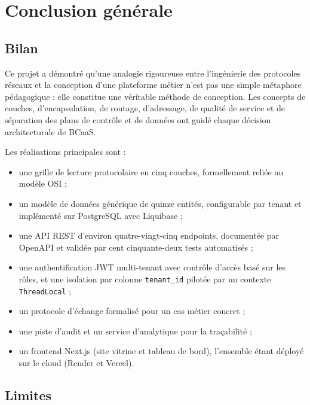 \chapter{Conclusion générale}
\label{chap:conclusion}

\section{Bilan}

Ce projet a démontré qu'une analogie rigoureuse entre l'ingénierie des protocoles réseaux
et la conception d'une plateforme métier n'est pas une simple métaphore pédagogique :
elle constitue une véritable méthode de conception. Les concepts de couches,
d'encapsulation, de routage, d'adressage, de qualité de service et de séparation des plans
de contrôle et de données ont guidé chaque décision architecturale de BCaaS.

Les réalisations principales sont :
\begin{itemize}
  \item une grille de lecture protocolaire en cinq couches, formellement reliée au modèle
        OSI ;
  \item un modèle de données générique de quinze entités, configurable par tenant et
        implémenté sur PostgreSQL avec Liquibase ;
  \item une API REST d'environ quatre-vingt-cinq endpoints, documentée par OpenAPI et
        validée par cent cinquante-deux tests automatisés ;
  \item une authentification JWT multi-tenant avec contrôle d'accès basé sur les rôles, et
        une isolation par colonne \texttt{tenant\_id} pilotée par un contexte
        \texttt{ThreadLocal} ;
  \item un protocole d'échange formalisé pour un cas métier concret ;
  \item une piste d'audit et un service d'analytique pour la traçabilité ;
  \item un frontend Next.js (site vitrine et tableau de bord), l'ensemble étant déployé sur
        le cloud (Render et Vercel).
\end{itemize}

\section{Limites}


